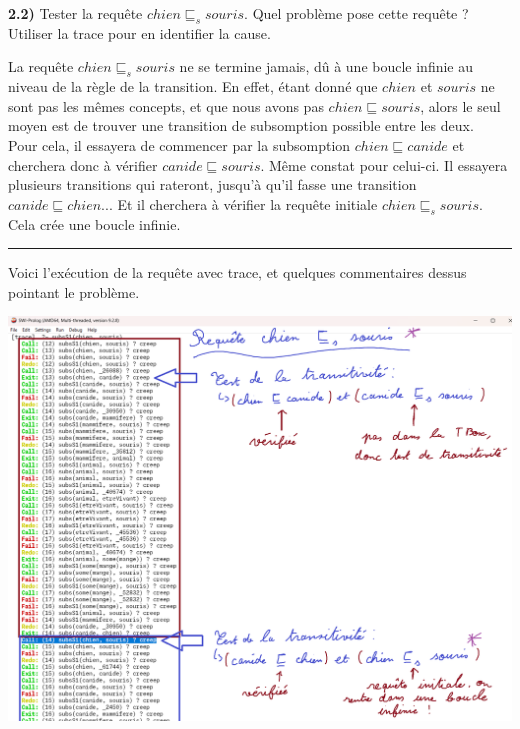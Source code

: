 \documentclass[a4paper,12pt]{report}
\begin{document}
\newpage

{}

\textbf{2.2)} Tester la requête \(chien \sqsubseteq_s  souris\). Quel problème pose cette requête ? Utiliser la trace pour en identifier la cause.



\begin{tcolorbox}[colback=gray!10, colframe=blue!30, coltitle=black, title=Réponse à la question 2.2 - 1/1]

    La requête \(chien \sqsubseteq_s  souris\) ne se termine jamais, dû à une boucle infinie au niveau de la règle de la transition. En effet, étant
        donné que \(chien\) et \(souris\) ne sont pas les mêmes concepts, et que nous avons pas \(chien \sqsubseteq souris\), alors le seul moyen est
        de trouver une transition de subsomption possible entre les deux.\\

    Pour cela, il essayera de commencer par la subsomption \(chien \sqsubseteq canide\) et cherchera donc à vérifier \(canide \sqsubseteq souris\). Même
        constat pour celui-ci. Il essayera plusieurs transitions qui rateront, jusqu'à qu'il fasse une transition \(canide \sqsubseteq chien\)... Et il
        cherchera à vérifier la requête initiale \(chien \sqsubseteq_s  souris\). Cela crée une boucle infinie.

    \vspace{0.5cm}
    \hrule
    \vspace{0.5cm}

    Voici l'exécution de la requête avec trace, et quelques commentaires dessus pointant le problème.
    \begin{center}
        \includegraphics[width=1\textwidth]{./images/chien_souris_infini.png}\\[1.5cm]
    \end{center}


\end{tcolorbox}
\end{document}
